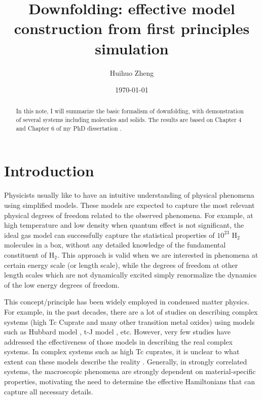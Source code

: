 \documentclass[aps, prb]{revtex4-1}
\begin{document}
\title{Downfolding: effective model construction from first principles simulation}
\author{Huihuo Zheng}
\date{\today}
\begin{abstract}
In this note, I will summarize the basic formalism of downfolding, with demonstration of several systems including molecules and solids. The results are based on Chapter 4 and Chapter 6 of my PhD dissertation \cite{Zheng2016}. 
\end{abstract}

\maketitle
\newcommand{\newt}[1]{{#1}}
\section{Introduction}
Physicists usually like to have an intuitive understanding of physical phenomena using simplified models. These models are expected to capture the most relevant physical degrees of freedom related to the observed phenomena. For example, at high temperature and low density when quantum effect is not significant, the ideal gas model can successfully capture the statistical properties of $10^{23}$ H$_{2}$ molecules in a box, without any detailed knowledge of the fundamental constituent of H$_{2}$. This approach is valid when we are interested in phenomena at certain energy scale (or length scale), while the degrees of freedom at other length scales which are not dynamically excited simply renormalize the dynamics of the low energy degrees of freedom. 

This concept/principle has been widely employed in condensed matter physics. For example, in the past decades, there are a lot of studies on describing complex systems (high Tc Cuprate and many other transition metal oxides) using models such as Hubbard model \cite{Yanagisawa2008}, t-J model \cite{Sorella2002}, etc. However, very few studies have addressed the effectiveness of those models in describing the real complex systems. In complex systems such as high Tc cuprates, it is unclear to what extent can these models describe the reality \cite{Anderson2013}. Generally, in strongly correlated systems, the macroscopic phenomena are strongly dependent on material-specific properties, motivating the need to determine the effective Hamiltonians that can capture all necessary details. 
\end{document}
